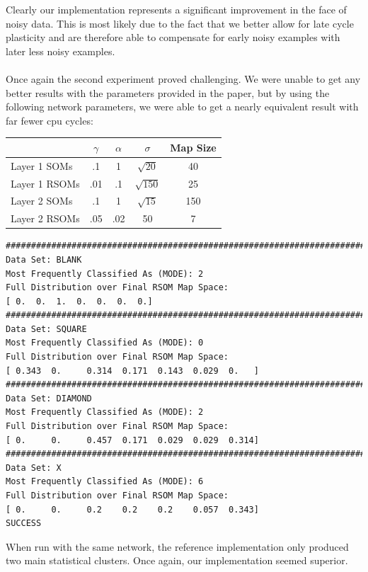 \documentclass[a4paper,10pt]{article}
\begin{document}
Clearly our implementation represents a significant improvement in the face of noisy data.  This is
most likely due to the fact that we better allow for late cycle plasticity and are therefore able
to compensate for early noisy examples with later less noisy examples.
\\
\\
Once again the second experiment proved challenging.  We were unable to get any better results with
the parameters provided in the paper, but by using the following network parameters, we were able
to get a nearly equivalent result with far fewer cpu cycles:
\begin{center}
  \begin{tabular}{ | l | c | c | c | c | }
    \hline
    & $\gamma$ & $\alpha$ & $\sigma$ & Map Size\\ \hline
    Layer 1 SOMs  & .1   & 1   & $\sqrt{20}$  & 40\\ \hline
    Layer 1 RSOMs & .01  & .1  & $\sqrt{150}$ & 25\\ \hline
    Layer 2 SOMs  & .1   & 1   & $\sqrt{15}$  & 150\\ \hline
    Layer 2 RSOMs &  .05 & .02 & 50 & 7 \\
    \hline
  \end{tabular}
\end{center}
\begin{center}
 \small

\begin{verbatim}
################################################################################
Data Set: BLANK
Most Frequently Classified As (MODE): 2
Full Distribution over Final RSOM Map Space:
[ 0.  0.  1.  0.  0.  0.  0.]
################################################################################
Data Set: SQUARE
Most Frequently Classified As (MODE): 0
Full Distribution over Final RSOM Map Space:
[ 0.343  0.     0.314  0.171  0.143  0.029  0.   ]
################################################################################
Data Set: DIAMOND
Most Frequently Classified As (MODE): 2
Full Distribution over Final RSOM Map Space:
[ 0.     0.     0.457  0.171  0.029  0.029  0.314]
################################################################################
Data Set: X
Most Frequently Classified As (MODE): 6
Full Distribution over Final RSOM Map Space:
[ 0.     0.     0.2    0.2    0.2    0.057  0.343]
SUCCESS
\end{verbatim}
\end{center}

When run with the same network, the reference implementation only produced two main statistical
clusters.  Once again, our implementation seemed superior.  
\end{document}
